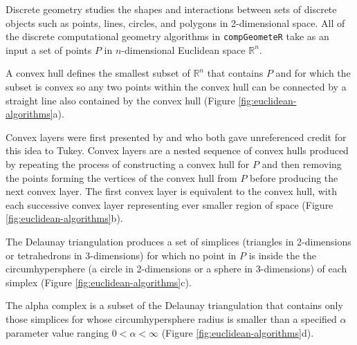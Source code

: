 \documentclass[12pt, a4paper]{article}
\begin{document}
Discrete geometry studies the shapes and interactions between sets of discrete objects such as points, lines, circles, and polygons in 2-dimensional space.  All of the discrete computational geometry algorithms in \texttt{compGeometeR} take as an input a set of points $P$ in $n$-dimensional Euclidean space $\mathbb{R}^n$.

A convex hull defines the smallest subset of $\mathbb{R}^n$ that contains $P$ and for which the subset is convex so any two points within the convex hull can be connected by a straight line also contained by the convex hull (Figure \ref{fig:euclidean-algorithms}a).

Convex layers were first presented by \cite{huber-1972} and \cite{barnett-1976} who both gave unreferenced credit for this idea to Tukey.  Convex layers are a nested sequence of convex hulls produced by repeating the process of constructing a convex hull for $P$ and then removing the points forming the vertices of the convex hull from $P$ before producing the next convex layer.  The first convex layer is equivalent to the convex hull, with each successive convex layer representing ever smaller region of space (Figure \ref{fig:euclidean-algorithms}b).

The Delaunay triangulation \citep{delaunay-1934} produces a set of simplices (triangles in 2-dimensions or tetrahedrons in 3-dimensions) for which no point in $P$ is inside the the circumhypersphere (a circle in 2-dimensions or a sphere in 3-dimensions) of each simplex (Figure \ref{fig:euclidean-algorithms}c).

The alpha complex \citep{edelsbrunner-1994} is a subset of the Delaunay triangulation that contains only those simplices for whose circumhypersphere radius is smaller than a specified $\alpha$ parameter value ranging $0 < \alpha < \infty$ (Figure \ref{fig:euclidean-algorithms}d).
\end{document}
